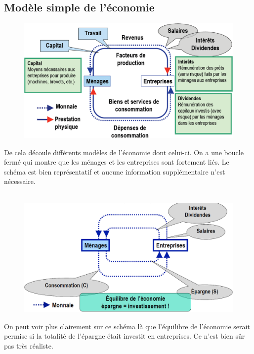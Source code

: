 \subsection{Modèle simple de l'économie}
\begin{figure}
\includegraphics[scale=0.3]{52}
\end{figure}
De cela découle différents modèles de l'économie dont celui-ci. On a une boucle fermé qui montre que les ménages et les entreprises sont fortement liés. Le schéma est bien représentatif et aucune information supplémentaire n'est nécessaire. \\\\

\begin{figure}
\includegraphics[scale=0.3]{53}
\end{figure}
On peut voir plus clairement sur ce schéma là que l'équilibre de l'économie serait permise si la totalité de l'épargne était investit en entreprises. Ce n'est bien sûr pas très réaliste.  \\\\\\\\\\\

